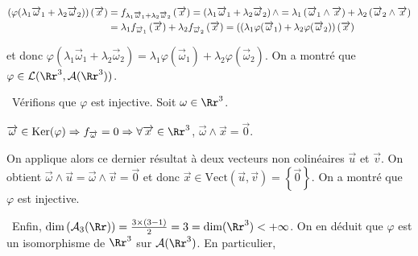 {\begin{enumerate}
{\begin{align*}\ensuremath
\left(\varphi(\lambda_1\overrightarrow{\omega}_1+\lambda_2\overrightarrow{\omega}_2)\right)\left(\overrightarrow{x}\right)&=f_{\lambda_1\overrightarrow{\omega}_1+\lambda_2\overrightarrow{\omega}_2}\left(\overrightarrow{x}\right)=\left(\lambda_1\overrightarrow{\omega}_1+\lambda_2\overrightarrow{\omega}_2\right)\wedge=\lambda_1\left(\overrightarrow{\omega}_1\wedge\overrightarrow{x}\right)+\lambda_2\left(\overrightarrow{\omega}_2\wedge\overrightarrow{x}\right)\\
 &=\lambda_1f_{\overrightarrow{\omega}_1}\left(\overrightarrow{x}\right)+\lambda_2f_{\overrightarrow{\omega}_2}\left(\overrightarrow{x}\right)=\left((\lambda_1\varphi(\overrightarrow{\omega}_1)+\lambda_2\varphi(\overrightarrow{\omega}_2)\right)\left(\overrightarrow{x}\right)
\end{align*}

et donc $\varphi(\lambda_1\overrightarrow{\omega}_1+\lambda_2\overrightarrow{\omega}_2)=\lambda_1\varphi(\overrightarrow{\omega}_1)+\lambda_2\varphi(\overrightarrow{\omega}_2)$. On a montré que $\varphi\in\mathcal{L}(\Rr^3,\mathcal{A}(\Rr^3))$.

\textbullet~Vérifions que $\varphi$ est injective. Soit $\omega\in\Rr^3$.

\begin{center}
$\overrightarrow{\omega}\in\text{Ker}(\varphi)\Rightarrow f_{\overrightarrow{\omega}}=0\Rightarrow\forall\overrightarrow{x}\in\Rr^3$, $\overrightarrow{\omega}\wedge\overrightarrow{x}=\overrightarrow{0}$.
\end{center}

On applique alors ce dernier résultat à deux vecteurs non colinéaires $\overrightarrow{u}$ et $\overrightarrow{v}$. On obtient $\overrightarrow{\omega}\wedge\overrightarrow{u}=\overrightarrow{\omega}\wedge\overrightarrow{v}=\overrightarrow{0}$ et donc $\overrightarrow{x}\in\text{Vect}\left(\overrightarrow{u},\overrightarrow{v}\right)=\left\{\overrightarrow{0}\right\}$. On a montré que $\varphi$ est injective.

\textbullet~Enfin, $\text{dim}\left(\mathcal{A}_3(\Rr)\right)= \frac{3\times(3-1)}{2}=3=\text{dim}(\Rr^3)<+\infty$. On en déduit que $\varphi$ est un isomorphisme de $\Rr^3$ sur $\mathcal{A}(\Rr^3)$. En particulier,

\begin{center}
\end{center}}
\end{enumerate}
}
